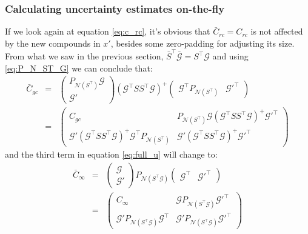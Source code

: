 \documentclass{article}
\newcommand{\Gmat}{\mathcal{G}}
\newcommand{\PNmat}[1]{P_{\mathcal{N}\left(#1\right)}}
\begin{document}
\subsubsection{Calculating uncertainty estimates on-the-fly}
If we look again at equation \ref{eq:c_rc}, it's obvious that $\bar{C}_{rc} = C_{rc}$ is not affected by the new compounds in $x'$, besides some zero-padding for adjusting its size. From what we saw in the previous section, $\bar{S}^\top \bar{\Gmat} = S^\top \Gmat$ and using \ref{eq:P_N_ST_G} we can conclude that:
\begin{eqnarray}
	\bar{C}_{gc} &=& \left( \begin{array}{c} \PNmat{S^\top} \Gmat \\ \hline \Gmat' \end{array} \right)
	\left(\Gmat^{\top}SS^{\top}\Gmat\right)^{+} 
	\left( \begin{array}{c|c} \Gmat^\top \PNmat{S^\top} & \Gmat'^\top \end{array} \right) 
\\
&=&
\left( \begin{array}{c|c} C_{gc} & \PNmat{S^\top} \Gmat \left(\Gmat^{\top}SS^{\top}\Gmat\right)^{+} \Gmat'^\top \\ \hline \Gmat' \left(\Gmat^{\top}SS^{\top}\Gmat\right)^{+} \Gmat^\top \PNmat{S^\top} & \Gmat'\left(\Gmat^{\top}SS^{\top}\Gmat\right)^{+} \Gmat'^\top \end{array} \right)
\end{eqnarray}
and the third term in equation \ref{eq:full_u} will change to:
\begin{eqnarray}
	\bar{C}_{\infty} &=& 
		\left(\begin{array}{c} \Gmat \\ \hline \Gmat' \end{array}\right)
		\PNmat{S^\top\Gmat}
		\left(\begin{array}{c|c} \Gmat^\top & \Gmat'^\top \end{array}\right)
\\ &=&
	\left(\begin{array}{c|c}
		C_\infty &
		\Gmat \PNmat{S^\top\Gmat} \Gmat'^\top \\ \hline
		\Gmat' \PNmat{S^\top\Gmat} \Gmat^\top &
		\Gmat' \PNmat{S^\top\Gmat} \Gmat'^\top
 \end{array}\right)
\end{eqnarray}
\end{document}
